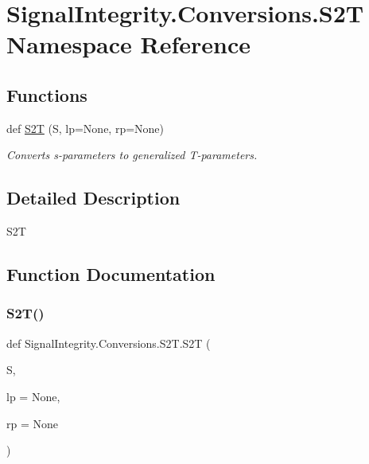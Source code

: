 \hypertarget{namespaceSignalIntegrity_1_1Conversions_1_1S2T}{}\section{Signal\+Integrity.\+Conversions.\+S2T Namespace Reference}
\label{namespaceSignalIntegrity_1_1Conversions_1_1S2T}
\subsection*{Functions}
\begin{DoxyCompactItemize}
\item 
def \hyperlink{namespaceSignalIntegrity_1_1Conversions_1_1S2T_a73cb3d43c1c889387cc71f299bbc6cf3}{S2T} (S, lp=None, rp=None)
\begin{DoxyCompactList}\small\item\em Converts s-\/parameters to generalized T-\/parameters. \end{DoxyCompactList}\end{DoxyCompactItemize}


\subsection{Detailed Description}
\begin{DoxyVerb}S2T\end{DoxyVerb}
 

\subsection{Function Documentation}
\mbox{\label{namespaceSignalIntegrity_1_1Conversions_1_1S2T_a73cb3d43c1c889387cc71f299bbc6cf3}} 
\subsubsection{\texorpdfstring{S2\+T()}{S2T()}}
{\footnotesize\ttfamily def Signal\+Integrity.\+Conversions.\+S2\+T.\+S2T (\begin{DoxyParamCaption}\item[{}]{S,  }\item[{}]{lp = {\ttfamily None},  }\item[{}]{rp = {\ttfamily None} }\end{DoxyParamCaption})}



